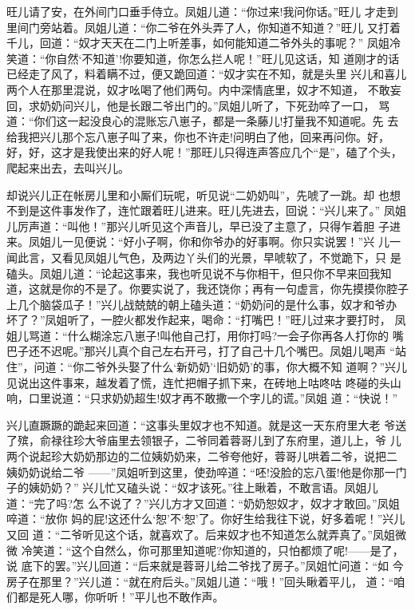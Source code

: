 旺儿请了安，在外间门口垂手侍立。凤姐儿道：“你过来!我问你话。”旺儿
才走到里间门旁站着。凤姐儿道：“你二爷在外头弄了人，你知道不知道？”旺儿
又打着千儿，回道：“奴才天天在二门上听差事，如何能知道二爷外头的事呢？”
凤姐冷笑道：“你自然‘不知道’!你要知道，你怎么拦人呢！”旺儿见这话，知
道刚才的话已经走了风了，料着瞒不过，便又跪回道：“奴才实在不知，就是头里
兴儿和喜儿两个人在那里混说，奴才吆喝了他们两句。内中深情底里，奴才不知道，
不敢妄回，求奶奶问兴儿，他是长跟二爷出门的。”凤姐儿听了，下死劲啐了一口，
骂道：“你们这一起没良心的混账忘八崽子，都是一条藤儿!打量我不知道呢。先
去给我把兴儿那个忘八崽子叫了来，你也不许走!问明白了他，回来再问你。好，
好，好，这才是我使出来的好人呢！”那旺儿只得连声答应几个“是”，磕了个头，
爬起来出去，去叫兴儿。

却说兴儿正在帐房儿里和小厮们玩呢，听见说“二奶奶叫”，先唬了一跳。却
也想不到是这件事发作了，连忙跟着旺儿进来。旺儿先进去，回说：“兴儿来了。”
凤姐儿厉声道：“叫他！”那兴儿听见这个声音儿，早已没了主意了，只得乍着胆
子进来。凤姐儿一见便说：“好小子啊，你和你爷办的好事啊。你只实说罢！”兴
儿一闻此言，又看见凤姐儿气色，及两边丫头们的光景，早唬软了，不觉跪下，只
是磕头。凤姐儿道：“论起这事来，我也听见说不与你相干，但只你不早来回我知
道，这就是你的不是了。你要实说了，我还饶你；再有一句虚言，你先摸摸你腔子
上几个脑袋瓜子！”兴儿战兢兢的朝上磕头道：“奶奶问的是什么事，奴才和爷办
坏了？”凤姐听了，一腔火都发作起来，喝命：“打嘴巴！”旺儿过来才要打时，
凤姐儿骂道：“什么糊涂忘八崽子!叫他自己打，用你打吗?一会子你再各人打你的
嘴巴子还不迟呢。”那兴儿真个自己左右开弓，打了自己十几个嘴巴。凤姐儿喝声
“站住”，问道：“你二爷外头娶了什么‘新奶奶’‘旧奶奶’的事，你大概不知
道啊？”兴儿见说出这件事来，越发着了慌，连忙把帽子抓下来，在砖地上咕咚咕
咚碰的头山响，口里说道：“只求奶奶超生!奴才再不敢撒一个字儿的谎。”凤姐
道：“快说！”

兴儿直蹶蹶的跪起来回道：“这事头里奴才也不知道。就是这一天东府里大老
爷送了殡，俞禄往珍大爷庙里去领银子，二爷同着蓉哥儿到了东府里，道儿上，爷
儿两个说起珍大奶奶那边的二位姨奶奶来，二爷夸他好，蓉哥儿哄着二爷，说把二
姨奶奶说给二爷
——”凤姐听到这里，使劲啐道：“呸!没脸的忘八蛋!他是你那一门子的姨奶奶？”
兴儿忙又磕头说：“奴才该死。”往上瞅着，不敢言语。凤姐儿道：“完了吗?怎
么不说了？”兴儿方才又回道：“奶奶恕奴才，奴才才敢回。”凤姐啐道：“放你
妈的屁!这还什么‘恕’不‘恕’了。你好生给我往下说，好多着呢！”兴儿又回
道：“二爷听见这个话，就喜欢了。后来奴才也不知道怎么就弄真了。”凤姐微微
冷笑道：“这个自然么，你可那里知道呢?你知道的，只怕都烦了呢!——是了，说
底下的罢。”兴儿回道：“后来就是蓉哥儿给二爷找了房子。”凤姐忙问道：“如
今房子在那里？”兴儿道：“就在府后头。”凤姐儿道：“哦！”回头瞅着平儿，
道：“咱们都是死人哪，你听听！”平儿也不敢作声。

